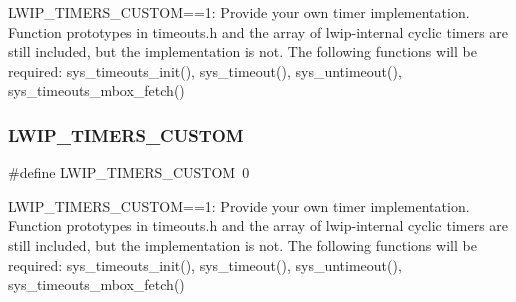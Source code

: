 L\+W\+I\+P\+\_\+\+T\+I\+M\+E\+R\+S\+\_\+\+C\+U\+S\+T\+OM==1\+: Provide your own timer implementation. Function prototypes in timeouts.\+h and the array of lwip-\/internal cyclic timers are still included, but the implementation is not. The following functions will be required\+: sys\+\_\+timeouts\+\_\+init(), sys\+\_\+timeout(), sys\+\_\+untimeout(), sys\+\_\+timeouts\+\_\+mbox\+\_\+fetch() \mbox{\label{group__lwip__opts__timers_gaff0ea56f3e3d8e86c49b50557bc13815}} 
\subsubsection{\texorpdfstring{L\+W\+I\+P\+\_\+\+T\+I\+M\+E\+R\+S\+\_\+\+C\+U\+S\+T\+OM}{LWIP\_TIMERS\_CUSTOM}\hspace{0.1cm}{\footnotesize\ttfamily [2/2]}}
{\footnotesize\ttfamily \#define L\+W\+I\+P\+\_\+\+T\+I\+M\+E\+R\+S\+\_\+\+C\+U\+S\+T\+OM~0}

L\+W\+I\+P\+\_\+\+T\+I\+M\+E\+R\+S\+\_\+\+C\+U\+S\+T\+OM==1\+: Provide your own timer implementation. Function prototypes in timeouts.\+h and the array of lwip-\/internal cyclic timers are still included, but the implementation is not. The following functions will be required\+: sys\+\_\+timeouts\+\_\+init(), sys\+\_\+timeout(), sys\+\_\+untimeout(), sys\+\_\+timeouts\+\_\+mbox\+\_\+fetch() 
